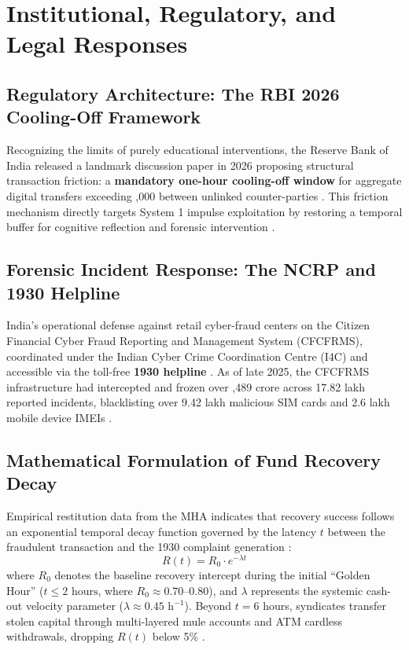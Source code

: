 \documentclass[journal,10pt,twocolumn]{IEEEtran}
\begin{document}
\section{Institutional, Regulatory, and Legal Responses}

\subsection{Regulatory Architecture: The RBI 2026 Cooling-Off Framework}
Recognizing the limits of purely educational interventions, the Reserve Bank of India released a landmark discussion paper in 2026 proposing structural transaction friction: a \textbf{mandatory one-hour cooling-off window} for aggregate digital transfers exceeding ,000 between unlinked counter-parties \cite{newsonair2026}. This friction mechanism directly targets System 1 impulse exploitation by restoring a temporal buffer for cognitive reflection and forensic intervention \cite{newsonair2026}.

\subsection{Forensic Incident Response: The NCRP and 1930 Helpline}
India's operational defense against retail cyber-fraud centers on the Citizen Financial Cyber Fraud Reporting and Management System (CFCFRMS), coordinated under the Indian Cyber Crime Coordination Centre (I4C) and accessible via the toll-free \textbf{1930 helpline} \cite{grokipedia2026, pib_helpline2023, pib_portal2025}. As of late 2025, the CFCFRMS infrastructure had intercepted and frozen over ,489 crore across 17.82 lakh reported incidents, blacklisting over 9.42 lakh malicious SIM cards and 2.6 lakh mobile device IMEIs \cite{pib_curbing2026}.

\subsection{Mathematical Formulation of Fund Recovery Decay}
Empirical restitution data from the MHA indicates that recovery success follows an exponential temporal decay function governed by the latency $t$ between the fraudulent transaction and the 1930 complaint generation \cite{pib_helpline2023, pib_curbing2026}:
\begin{equation}
R(t) = R_0 \cdot e^{-\lambda t}
\end{equation}
where $R_0$ denotes the baseline recovery intercept during the initial ``Golden Hour'' ($t \le 2\text{ hours}$, where $R_0 \approx 0.70$--$0.80$), and $\lambda$ represents the systemic cash-out velocity parameter ($\lambda \approx 0.45\text{ h}^{-1}$). Beyond $t = 6$ hours, syndicates transfer stolen capital through multi-layered mule accounts and ATM cardless withdrawals, dropping $R(t)$ below 5\% \cite{pib_helpline2023, pib_curbing2026}.
\end{document}
